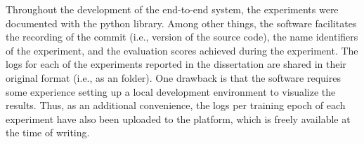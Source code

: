 
Throughout the development of the end-to-end system, the
experiments were documented with the 
 python library. Among other
things, the software facilitates the recording of the
 commit (i.e., version of the source code), the
name identifiers of the experiment, and the evaluation
scores achieved during the experiment. The logs for each of
the experiments reported in the dissertation are shared in
their original  format (i.e., as an
 folder). One drawback is that the software
requires some experience setting up a local development
environment to visualize the results. Thus, as an additional
convenience, the logs per training epoch of each experiment
have also been uploaded to the
platform, which is
freely available at the time of writing.
